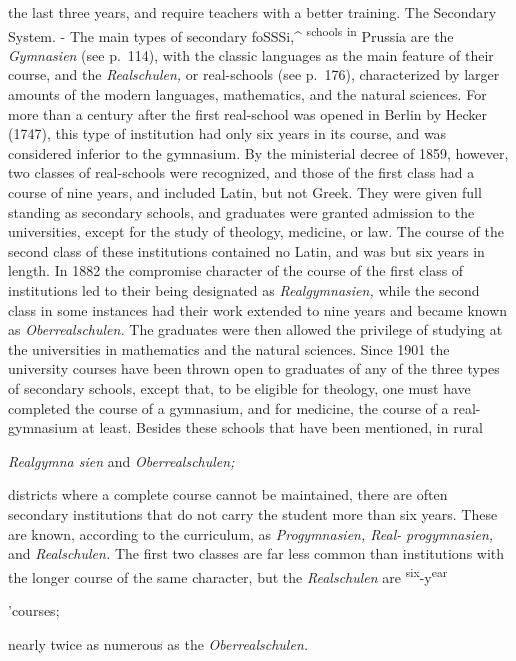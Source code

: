 \documentclass[
]{book}
\begin{document}
the last three years, and require teachers with a better training. The Secondary System. - The main types of secondary foSSSi,\^{} \textsuperscript{schools} \textsuperscript{in} Prussia are the \emph{Gymnasien} (see p.~114), with the classic languages as the main feature of their course, and the \emph{Realschulen,} or real-schools (see p.~176), characterized by larger amounts of the modern languages, mathematics, and the natural sciences. For more than a century after the first real-school was opened in Berlin by Hecker (1747), this type of institution had only six years in its course, and was considered inferior to the gymnasium. By the ministerial decree of 1859, however, two classes of real-schools were recognized, and those of the first class had a course of nine years, and included Latin, but not Greek. They were given full standing as secondary schools, and graduates were granted admission to the universities, except for the study of theology, medicine, or law. The course of the second class of these institutions contained no Latin, and was but six years in length. In 1882 the compromise character of the course of the first class of institutions led to their being designated as \emph{Realgymnasien,} while the second class in some instances had their work extended to nine years and became known as \emph{Oberrealschulen.} The graduates were then allowed the privilege of studying at the universities in mathematics and the natural sciences. Since 1901 the university courses have been thrown open to graduates of any of the three types of secondary schools, except that, to be eligible for theology, one must have completed the course of a gymnasium, and for medicine, the course of a real-gymnasium at least. Besides these schools that have been mentioned, in rural

\emph{Realgymna sien} and \emph{Oberrealschulen;}

districts where a complete course cannot be maintained, there are often secondary institutions that do not carry the student more than six years. These are known, according to the curriculum, as \emph{Progymnasien, Real-} \emph{progymnasien,} and \emph{Realschulen.} The first two classes are far less common than institutions with the longer course of the same character, but the \emph{Realschulen} are \textsuperscript{six}-y\textsuperscript{ear}

'courses;

nearly twice as numerous as the \emph{Oberrealschulen.}
\end{document}
